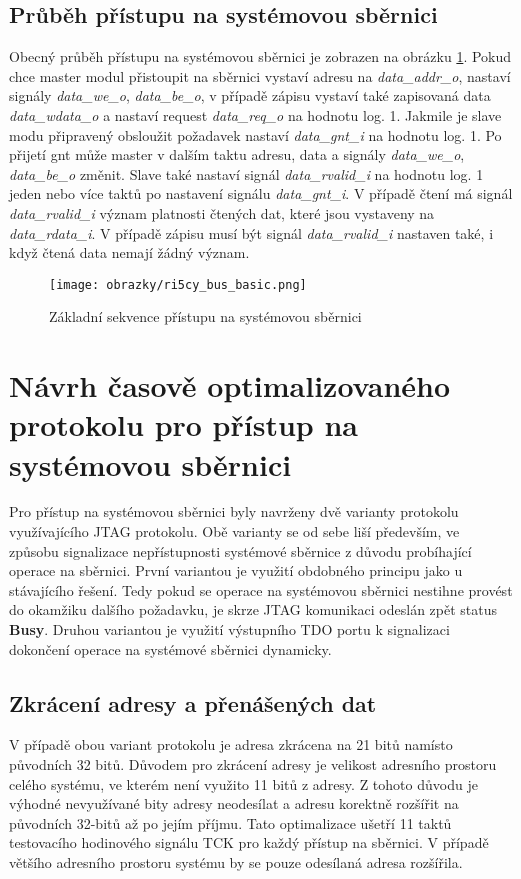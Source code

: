 \subsection{Průběh přístupu na systémovou sběrnici}
Obecný průběh přístupu na systémovou sběrnici je zobrazen na obrázku \ref{fig:ri5cy_bus_basic}. Pokud chce master modul přistoupit na sběrnici vystaví adresu na \textit{data\_addr\_o}, nastaví signály \textit{data\_we\_o}, \textit{data\_be\_o}, v případě zápisu vystaví také zapisovaná data \textit{data\_wdata\_o} a nastaví request \textit{data\_req\_o} na hodnotu log. 1. Jakmile je slave modu připravený obsloužit požadavek nastaví \textit{data\_gnt\_i} na hodnotu log. 1. Po přijetí gnt může master v dalším taktu adresu, data a signály \textit{data\_we\_o}, \textit{data\_be\_o} změnit. Slave také nastaví signál \textit{data\_rvalid\_i} na hodnotu log. 1 jeden nebo více taktů po nastavení signálu \textit{data\_gnt\_i}. V případě čtení má signál \textit{data\_rvalid\_i} význam platnosti čtených dat, které jsou vystaveny na \textit{data\_rdata\_i}. V případě zápisu musí být signál \textit{data\_rvalid\_i} nastaven také, i když čtená data nemají žádný význam. \cite{ri5cy}

\begin{figure}[!h]
  \begin{center}
    \texttt{[image: obrazky/ri5cy\_bus\_basic.png]}
  \end{center}
  \caption{Základní sekvence přístupu na systémovou sběrnici \cite{ri5cy}}
	\label{fig:ri5cy_bus_basic}
\end{figure}

\section{Návrh časově optimalizovaného protokolu pro přístup na systémovou sběrnici}	\label{sec:protokoly}
Pro přístup na systémovou sběrnici byly navrženy dvě varianty protokolu využívajícího JTAG protokolu. Obě varianty se od sebe liší především, ve způsobu signalizace nepřístupnosti systémové sběrnice z důvodu probíhající operace na sběrnici. První variantou je využití obdobného principu jako u stávajícího řešení. Tedy pokud se operace na systémovou sběrnici nestihne provést do okamžiku dalšího požadavku, je skrze JTAG komunikaci odeslán zpět status \textbf{Busy}. Druhou variantou je využití výstupního \acs{TDO} portu k signalizaci dokončení operace na systémové sběrnici dynamicky.

\subsection{Zkrácení adresy a přenášených dat}
V případě obou variant protokolu je adresa zkrácena na 21 bitů namísto původních 32 bitů. Důvodem pro zkrácení adresy je velikost adresního prostoru celého systému, ve kterém není využito 11 bitů z adresy. Z tohoto důvodu je výhodné nevyužívané bity adresy neodesílat a adresu korektně rozšířit na původních 32-bitů až po jejím příjmu. Tato optimalizace ušetří 11 taktů testovacího hodinového signálu \acs{TCK} pro každý přístup na sběrnici. V případě většího adresního prostoru systému by se pouze odesílaná adresa rozšířila.

